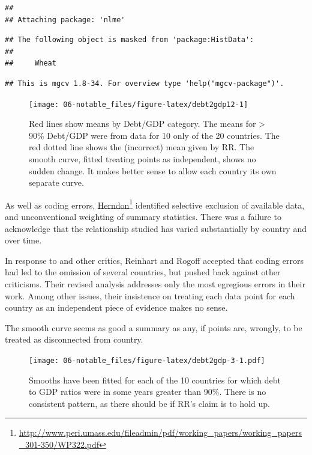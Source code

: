 \documentclass[
  10pt,
  b5paper]{book}
\begin{document}
\begin{verbatim}
## 
## Attaching package: 'nlme'
\end{verbatim}

\begin{verbatim}
## The following object is masked from 'package:HistData':
## 
##     Wheat
\end{verbatim}

\begin{verbatim}
## This is mgcv 1.8-34. For overview type 'help("mgcv-package")'.
\end{verbatim}

\begin{figure}[H]

{\centering \texttt{[image: 06-notable\_files/figure-latex/debt2gdp12-1]} 

}

\caption{Red lines show means by Debt/GDP category.
The means for > 90\% Debt/GDP were from data for 10 only of the
20 countries.  The red dotted line shows the (incorrect) 
mean given by RR.  The smooth curve, fitted treating points
as independent, shows no sudden change.  It makes better sense
to allow each country its own separate curve.}\label{fig:debt2gdp12}
\end{figure}

As well as coding errors,
\href{http://www.peri.umass.edu/fileadmin/pdf/working_papers/working_papers_301-350/WP322.pdf}{Herndon}\footnote{\url{http://www.peri.umass.edu/fileadmin/pdf/working_papers/working_papers_301-350/WP322.pdf}} identified selective exclusion of available data,
and unconventional weighting of summary statistics. There was a
failure to acknowledge that the relationship studied has varied
substantially by country and over time.

In response to \citet{herndon2014does} and other critics, Reinhart and
Rogoff accepted that coding errors had led to the omission of
several countries, but pushed back against other criticisms.
Their revised analysis addresses only the most egregious errors
in their work. Among other issues, their insistence on treating
each data point for each country as an independent piece of
evidence makes no sense.

The smooth curve seems as good a summary as any, if
points are, wrongly, to be treated as disconnected from country.

\begin{figure}
\centering
\texttt{[image: 06-notable\_files/figure-latex/debt2gdp-3-1.pdf]}
\caption{\label{fig:debt2gdp-3}Smooths have been fitted for each of the 10 countries
for which debt to GDP ratios were in some years greater than 90\%.
There is no consistent pattern, as there should be if RR's claim
is to hold up.}
\end{figure}
\end{document}
